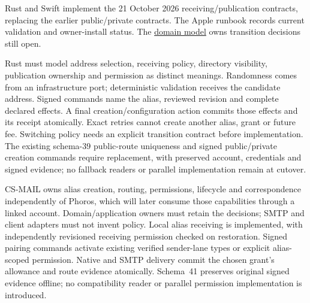 \documentclass[11pt]{article}
\begin{document}
Rust and Swift implement the 21 October 2026 receiving/publication contracts, replacing the
earlier public/private contracts. The Apple runbook records current validation
and owner-install status. The
\href{DOMAIN_MODEL.md}{domain model} owns transition decisions still open.

Rust must model address selection, receiving policy, directory visibility,
publication ownership and permission as distinct meanings. Randomness comes from
an infrastructure port; deterministic validation receives the candidate address.
Signed commands name the alias, reviewed revision and complete declared effects.
A final creation/configuration action commits those effects and its receipt
atomically. Exact retries cannot create another alias, grant or future fee.
Switching policy needs an explicit transition contract before implementation.
The existing schema-39 public-route uniqueness and signed public/private creation
commands require replacement, with preserved account, credentials and signed
evidence; no fallback readers or parallel implementation remain at cutover.


CS-MAIL owns alias creation, routing, permissions, lifecycle and correspondence
independently of Phoros, which will later consume those capabilities through a
linked account. Domain/application owners must retain the decisions; SMTP and
client adapters must not invent policy. Local alias receiving is implemented,
with independently revisioned receiving permission checked on restoration.
Signed pairing commands activate existing verified sender-lane types or explicit
alias-scoped permission. Native and SMTP delivery commit the chosen grant's
allowance and route evidence atomically. Schema~41 preserves original signed
evidence offline; no compatibility reader or parallel permission implementation
is introduced.
\end{document}
